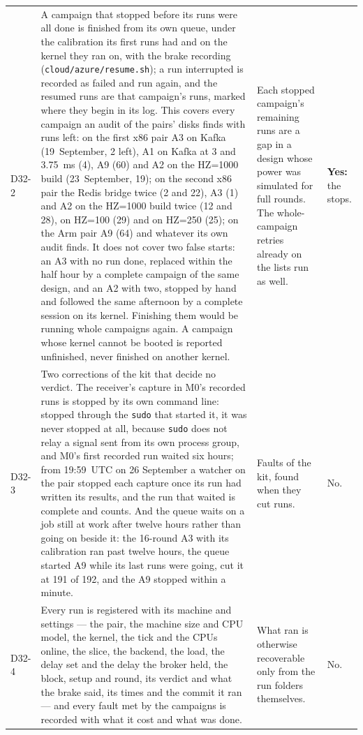 \documentclass[11pt]{article}
\begin{document}
{\begin{longtable}{@{}p{1.1cm} >{\raggedright\arraybackslash}p{6.1cm} >{\raggedright\arraybackslash}p{6.0cm} >{\raggedright\arraybackslash}p{2.2cm}@{}}
D32-2 & A campaign that stopped before its runs were all done is finished from its own queue, under the calibration its first runs had and on the kernel they ran on, with the brake recording (\texttt{cloud/azure/resume.sh}); a run interrupted is recorded as failed and run again, and the resumed runs are that campaign's runs, marked where they begin in its log. This covers every campaign an audit of the pairs' disks finds with runs left: on the first x86 pair A3 on Kafka (19~September, 2 left), A1 on Kafka at 3 and 3.75~ms (4), A9 (60) and A2 on the HZ=1000 build (23~September, 19); on the second x86 pair the Redis bridge twice (2 and 22), A3 (1) and A2 on the HZ=1000 build twice (12 and 28), on HZ=100 (29) and on HZ=250 (25); on the Arm pair A9 (64) and whatever its own audit finds. It does not cover two false starts: an A3 with no run done, replaced within the half hour by a complete campaign of the same design, and an A2 with two, stopped by hand and followed the same afternoon by a complete session on its kernel. Finishing them would be running whole campaigns again. A campaign whose kernel cannot be booted is reported unfinished, never finished on another kernel. & Each stopped campaign's remaining runs are a gap in a design whose power was simulated for full rounds. The whole-campaign retries already on the lists run as well. & \textbf{Yes:} the stops. \\
D32-3 & Two corrections of the kit that decide no verdict. The receiver's capture in M0's recorded runs is stopped by its own command line: stopped through the \texttt{sudo} that started it, it was never stopped at all, because \texttt{sudo} does not relay a signal sent from its own process group, and M0's first recorded run waited six hours; from 19:59~UTC on 26 September a watcher on the pair stopped each capture once its run had written its results, and the run that waited is complete and counts. And the queue waits on a job still at work after twelve hours rather than going on beside it: the 16-round A3 with its calibration ran past twelve hours, the queue started A9 while its last runs were going, cut it at 191 of 192, and the A9 stopped within a minute. & Faults of the kit, found when they cut runs. & No. \\
D32-4 & Every run is registered with its machine and settings --- the pair, the machine size and CPU model, the kernel, the tick and the CPUs online, the slice, the backend, the load, the delay set and the delay the broker held, the block, setup and round, its verdict and what the brake said, its times and the commit it ran --- and every fault met by the campaigns is recorded with what it cost and what was done. & What ran is otherwise recoverable only from the run folders themselves. & No. \\
\bottomrule
\end{longtable}}
\end{document}
